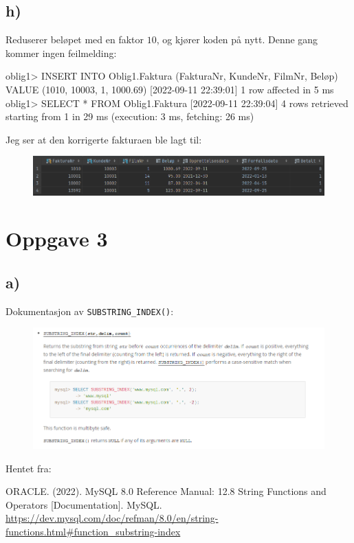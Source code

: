 \documentclass[%
notitlepage,
 amsmath,amssymb,
 aps,
rmp,
]{revtex4-2}  %
\begin{document}
\subsection*{h)}
Reduserer beløpet med en faktor \(10\), og kjører koden på nytt. Denne gang kommer ingen feilmelding:
\begin{sql}
oblig1> INSERT INTO Oblig1.Faktura (FakturaNr, KundeNr, FilmNr, Beløp)
        VALUE (1010, 10003, 1, 1000.69)
[2022-09-11 22:39:01] 1 row affected in 5 ms
oblig1> SELECT *
        FROM Oblig1.Faktura
[2022-09-11 22:39:04] 4 rows retrieved starting from 1 in 29 ms (execution: 3 ms, fetching: 26 ms)
\end{sql}
Jeg ser at den korrigerte fakturaen ble lagt til:
\begin{figure}[H]
\centering\includegraphics[width=\columnwidth]{op2h.png}
\end{figure}

\newpage
\section*{Oppgave 3}
\subsection*{a)}
Dokumentasjon av \verb+SUBSTRING_INDEX()+:
\begin{figure}[H]
\centering\includegraphics[width=\columnwidth]{op3a.png}
\end{figure}
Hentet fra:

ORACLE. (2022). MySQL 8.0 Reference Manual: 12.8 String Functions and Operators [Documentation]. MySQL. \url{https://dev.mysql.com/doc/refman/8.0/en/string-functions.html#function_substring-index}
\end{document}
